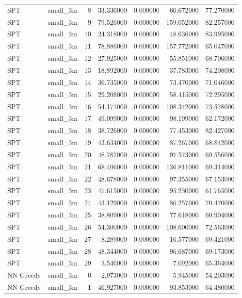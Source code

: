 \begin{tabular}{llrrrrr}
SPT & small_3m & 8 & 33.336000 & 0.000000 & 66.672000 & 77.270000 \\
SPT & small_3m & 9 & 79.526000 & 0.000000 & 159.052000 & 82.257000 \\
SPT & small_3m & 10 & 24.318000 & 0.000000 & 48.636000 & 83.995000 \\
SPT & small_3m & 11 & 78.886000 & 0.000000 & 157.772000 & 65.047000 \\
SPT & small_3m & 12 & 27.925000 & 0.000000 & 55.851000 & 68.706000 \\
SPT & small_3m & 13 & 18.892000 & 0.000000 & 37.783000 & 74.208000 \\
SPT & small_3m & 14 & 36.735000 & 0.000000 & 73.470000 & 71.046000 \\
SPT & small_3m & 15 & 29.208000 & 0.000000 & 58.415000 & 72.295000 \\
SPT & small_3m & 16 & 54.171000 & 0.000000 & 108.342000 & 73.578000 \\
SPT & small_3m & 17 & 49.099000 & 0.000000 & 98.199000 & 62.172000 \\
SPT & small_3m & 18 & 38.726000 & 0.000000 & 77.453000 & 82.427000 \\
SPT & small_3m & 19 & 43.634000 & 0.000000 & 87.267000 & 68.842000 \\
SPT & small_3m & 20 & 48.787000 & 0.000000 & 97.573000 & 69.556000 \\
SPT & small_3m & 21 & 68.406000 & 0.000000 & 136.811000 & 69.314000 \\
SPT & small_3m & 22 & 48.678000 & 0.000000 & 97.355000 & 67.153000 \\
SPT & small_3m & 23 & 47.615000 & 0.000000 & 95.230000 & 61.765000 \\
SPT & small_3m & 24 & 43.129000 & 0.000000 & 86.257000 & 70.470000 \\
SPT & small_3m & 25 & 38.809000 & 0.000000 & 77.618000 & 60.904000 \\
SPT & small_3m & 26 & 54.300000 & 0.000000 & 108.600000 & 72.563000 \\
SPT & small_3m & 27 & 8.289000 & 0.000000 & 16.577000 & 69.421000 \\
SPT & small_3m & 28 & 48.344000 & 0.000000 & 96.687000 & 69.173000 \\
SPT & small_3m & 29 & 3.546000 & 0.000000 & 7.092000 & 65.364000 \\
NN-Greedy & small_3m & 0 & 2.973000 & 0.000000 & 5.945000 & 54.203000 \\
NN-Greedy & small_3m & 1 & 46.927000 & 0.000000 & 93.853000 & 64.480000 \\

\end{tabular}
